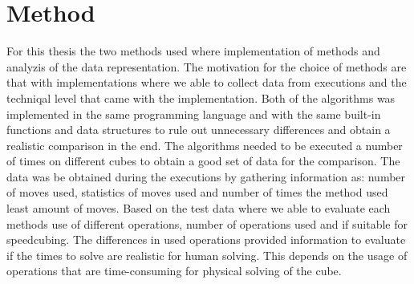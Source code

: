 \documentclass[a4paper,11pt]{kth-mag}
\begin{document}
\chapter{Method}
For this thesis the two methods used where implementation of methods and analyzis of the data representation. The motivation for the choice of methods are that with implementations where we able to collect data from executions and the techniqal level that came with the implementation. 
Both of the algorithms was implemented in the same programming language and with the same built-in functions and data structures to rule out unnecessary differences and obtain a realistic comparison in the end.
The algorithms needed to be executed a number of times on different cubes to obtain a good set of data for the comparison. The data was be obtained during the executions by gathering information as: number of moves used, statistics of moves used and number of times the method used least amount of moves.  
Based on the test data where we able to evaluate each methods use of different operations, number of operations used and if suitable for speedcubing. The differences in used operations provided information to evaluate if the times to solve are realistic for human solving. This depends on the usage of operations that are time-consuming for physical solving of the cube. 
\end{document}

